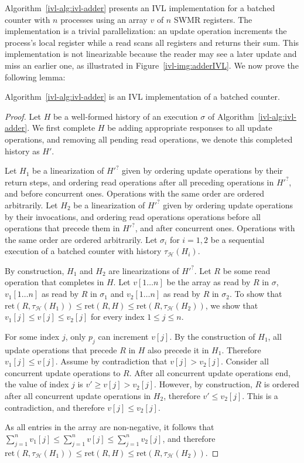 Algorithm~\ref{ivl-alg:ivl-adder} presents an IVL implementation for a batched counter
with $n$ processes using an array $v$ of $n$ SWMR registers.
The implementation is a trivial parallelization: an {\sc update} operation increments
the process's local
register while a {\sc read} scans all registers and returns their sum. This
implementation is not linearizable because the reader may see a later {\sc update}
and miss an earlier one, as illustrated in Figure~\ref{ivl-img:adderIVL}.
We now prove the following lemma:
\begin{lemma}
    Algorithm~\ref{ivl-alg:ivl-adder} is an IVL implementation of a batched counter.
    \label{ivl-lmma:ivl-adder}
\end{lemma}
\begin{proof}
    Let $H$ be a well-formed history of an execution $\sigma$ of Algorithm~\ref{ivl-alg:ivl-adder}.
    We first complete $H$ be adding appropriate responses to all {\sc update} operations, and removing all pending {\sc read} operations, we denote
    this completed history as $H'$.

    Let $H_1$ be a linearization of $H'^?$ given by ordering {\sc update} operations by their
    return steps, and ordering {\sc read} operations after all preceding operations in $H'^?$, and before concurrent ones. Operations
    with the same order are ordered arbitrarily.
    Let $H_2$ be a linearization of $H'^?$ given by ordering {\sc update} operations by their
    invocations, and ordering {\sc read} operations operations before all operations that precede them in $H'^?$, and after concurrent ones. Operations
    with the same order are ordered arbitrarily.
    Let $\sigma_i$ for $i=1,2$ be a sequential execution of a batched counter with history $\tau_\mathcal{H}(H_i)$.

    By construction, $H_1$ and $H_2$ are linearizations of $H'^?$. Let $R$ be some {\sc read} operation that completes
    in $H$. Let $v[1 \dots n]$ be the array as read by $R$ in $\sigma$, $v_1[1 \dots n]$ as read by $R$ in $\sigma_1$
    and $v_2[1 \dots n]$ as read by $R$ in $\sigma_2$. To show that
    $\text{ret}(R, \tau_\mathcal{H}(H_1)) \leq \text{ret}(R, H) \leq \text{ret}(R, \tau_\mathcal{H}(H_2))$,
    we show that $v_1[j] \leq v[j] \leq v_2[j]$ for every index $1 \leq j \leq n$.

    For some index $j$, only $p_j$ can increment $v[j]$. By the construction of $H_1$, all {\sc update} operations
    that precede $R$ in $H$ also precede it in $H_1$. Therefore $v_1[j] \leq v[j]$. Assume by contradiction that $v[j] > v_2[j]$.
    Consider all concurrent {\sc update} operations to $R$. After all concurrent {\sc update} operations end, the value
    of index $j$ is $v' \geq v[j] > v_2[j]$. However, by construction, $R$ is ordered after all concurrent {\sc update}
    operations in $H_2$, therefore $v' \leq v_2[j]$. This is a contradiction, and therefore $v[j] \leq v_2[j]$.

    As all entries in the array are non-negative, it follows that $\sum_{j=1}^n v_1[j] \leq \sum_{j=1}^n v[j] \leq \sum_{j=1}^n v_2[j]$, and
    therefore $\text{ret}(R, \tau_\mathcal{H}(H_1)) \leq \text{ret}(R, H) \leq \text{ret}(R, \tau_\mathcal{H}(H_2))$.
\end{proof}

